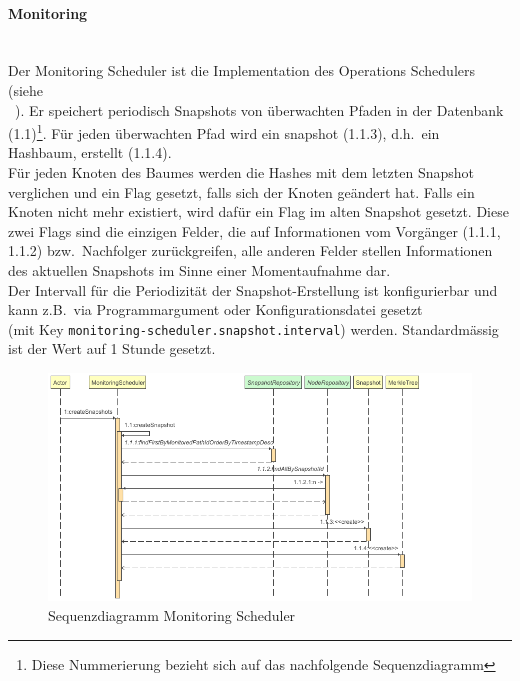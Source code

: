\documentclass[a4paper,12pt]{report}
\begin{document}
    \paragraph*{Monitoring}\mbox{}\\
    Der Monitoring Scheduler ist die Implementation des Operations Schedulers (siehe\\~).
    Er speichert periodisch Snapshots von überwachten Pfaden in der Datenbank (1.1)\footnote{Diese Nummerierung bezieht sich auf das nachfolgende Sequenzdiagramm}.
    Für jeden überwachten Pfad wird ein \gls{snapshot} (1.1.3), d.h.\ ein Hashbaum, erstellt (1.1.4).\\
    Für jeden Knoten des Baumes werden die Hashes mit dem letzten Snapshot verglichen und ein Flag gesetzt, falls sich der Knoten geändert hat.
    Falls ein Knoten nicht mehr existiert, wird dafür ein Flag im alten Snapshot gesetzt.
    Diese zwei Flags sind die einzigen Felder, die auf Informationen vom Vorgänger (1.1.1, 1.1.2) bzw.\ Nachfolger zurückgreifen,
    alle anderen Felder stellen Informationen des aktuellen Snapshots im Sinne einer Momentaufnahme dar.
    \\Der Intervall für die Periodizität der Snapshot-Erstellung ist konfigurierbar und kann z.B.\ via Programmargument oder Konfigurationsdatei gesetzt
    \\(mit Key \texttt{monitoring-scheduler.snapshot.interval}) werden.
    Standardmässig ist der Wert auf 1 Stunde gesetzt.
    \begin{figure}
        \centering
        \includegraphics[width=1\textwidth]{assets/MonitoringScheduler_createSnapshots_seq_diag}
        \caption{Sequenzdiagramm Monitoring Scheduler}
        \label{fig:seq-diag-monitoring-scheduler}
    \end{figure}
\end{document}
